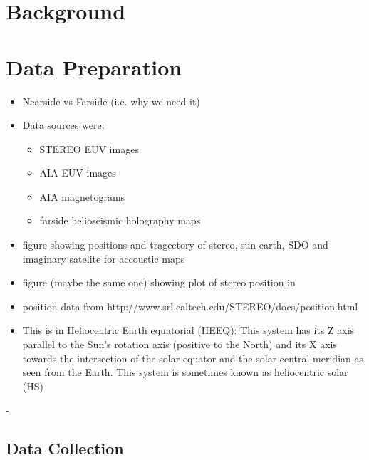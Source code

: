\documentclass[11pt,a4paper,onecolumn]{report}
\begin{document}
%
%
%
%
\chapter{Background}
%
%
%
%








%
%
%
%
\chapter{Data Preparation}
%
%
%
%




\begin{itemize}
  \item Nearside vs Farside (i.e. why we need it)
  \item Data sources were:
        \begin{itemize}
          \item STEREO EUV images
          \item AIA EUV images
          \item AIA magnetograms
          \item farside helioseismic holography maps
        \end{itemize}
  \item figure showing positions and tragectory of stereo, sun earth, SDO and
        imaginary satelite for accoustic maps
  \item figure (maybe the same one) showing plot of stereo position in
  \item position data from http://www.srl.caltech.edu/STEREO/docs/position.html
  \item This is in Heliocentric Earth equatorial (HEEQ): This system has its Z
        axis parallel to the Sun's rotation axis (positive to the North) and its X
        axis towards the intersection of the solar equator and the solar central
        meridian as seen from the Earth. This system is sometimes known as
        heliocentric solar (HS)
\end{itemize}

-

\section{Data Collection}
\end{document}
